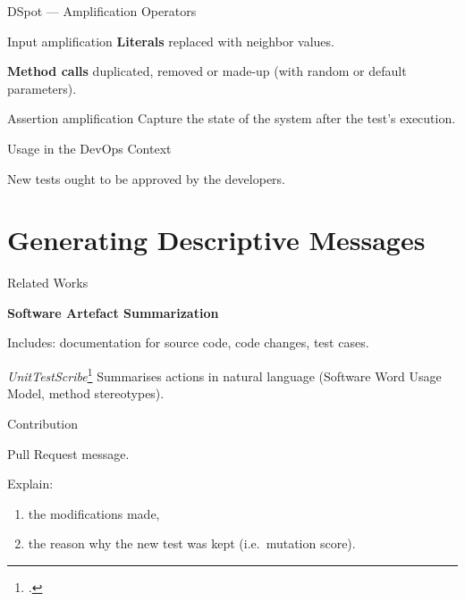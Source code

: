 \documentclass[aspectratio=169,dvipsnames]{beamer}
\begin{document}
\begin{frame}{DSpot --- Amplification Operators}
  \begin{block}{Input amplification}
    \textbf{Literals \textrightarrow{}} replaced with neighbor values.

    \textbf{Method calls \textrightarrow{}} duplicated, removed or made-up (with random or default parameters).
  \end{block}

  \vfill
  \pause{}

  \begin{block}{Assertion amplification}
    Capture the state of the system after the test's execution.
  \end{block}
\end{frame}

\begin{frame}{Usage in the DevOps Context}
  \begin{center}
    \alert{New tests ought to be approved by the developers.}
  \end{center}
\end{frame}


\section{Generating Descriptive Messages}

\begin{frame}{Related Works}
  \begin{center}
    \textbf{\Large{Software Artefact Summarization}}
  \end{center}

  Includes: documentation for source code, code changes, \alert{test cases}.

  \vfill{}
  \pause{}

  \textit{UnitTestScribe}\footcite{li2016automatically}
  Summarises actions in natural language (Software Word Usage Model, method stereotypes).
\end{frame}

\begin{frame}{Contribution}
  \begin{center}
    Pull Request message.
  \end{center}

  Explain:
  \begin{enumerate}
    \item the modifications made,
    \item the reason why the new test was kept (i.e.\ mutation score).
  \end{enumerate}
\end{frame}
\end{document}
